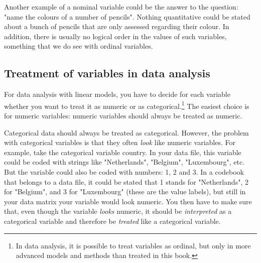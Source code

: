 Another example of a nominal variable could be the answer to the question: "name the colours of a number of pencils". Nothing quantitative could be stated about a bunch of pencils that are only assessed regarding their colour. In addition, there is usually no logical order in the values of such variables, something that we do see with ordinal variables.



\subsection{Treatment of variables in data analysis}
For data analysis with linear models, you have to decide for each variable whether you want to treat it as numeric or as categorical.\footnote{In data analysis, it is possible to treat variables as ordinal, but only in more advanced models and methods than treated in this book.} The easiest choice is for numeric variables: numeric variables should always be treated as numeric.

Categorical data should always be treated as categorical. However, the problem with categorical variables is that they often \textit{look} like numeric variables. For example, take the categorical variable country. In your data file, this variable could be coded with strings like "Netherlands", "Belgium", "Luxembourg", etc. But the variable could also be coded with numbers: 1, 2 and 3. In a codebook that belongs to a data file, it could be stated that 1 stands for "Netherlands", 2 for "Belgium", and 3 for "Luxembourg" (these are the value labels), but still in your data matrix your variable would look numeric. You then have to make sure that, even though the variable \textit{looks} numeric, it should be \textit{interpreted} as a categorical variable and therefore be \textit{treated} like a categorical variable.

